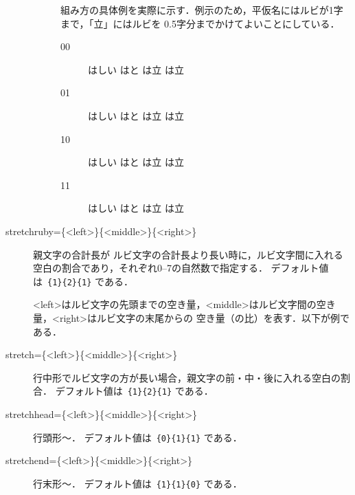 \documentclass[b5paper,10pt]{ltjsarticle}
\begin{document}
\begin{description}
\begin{description}
組み方の具体例を実際に示す．例示のため，平仮名にはルビが1字まで，「立」にはルビを
0.5字分までかけてよいことにしている．
\begin{description}
\item[00]{%
%
はしい
  \quad はと\quad
は立\quad
は立\par}
\item[01]{%
%
はしい
  \quad はと\quad
は立\quad
は立\par}
\item[10]{%
%
はしい
  \quad はと\quad
は立\quad
は立\par}
\item[11]{%
%
はしい\quad
はと\quad
は立\quad
は立\par}
\end{description} 

\end{description}
\item[stretchruby=\{<left>\}\{<middle>\}\{<right>\}] 親文字の合計長が
ルビ文字の合計長より長い時に，ルビ文字間に入れる空白の割合であり，それぞれ0--7の自然数で指定する．
デフォルト値は\ \verb+{1}{2}{1}+ である．

<left>はルビ文字の先頭までの空き量，<middle>はルビ文字間の空き量，<right>はルビ文字の末尾からの
空き量（の比）を表す．以下が例である．
\begin{LTXexample}[width=0.3\textwidth]
\Large
{}
\end{LTXexample}
\item[stretch=\{<left>\}\{<middle>\}\{<right>\}]
行中形でルビ文字の方が長い場合，親文字の前・中・後に入れる空白の割合．
デフォルト値は\ \verb+{1}{2}{1}+ である．
\item[stretchhead=\{<left>\}\{<middle>\}\{<right>\}] 行頭形〜．
デフォルト値は\ \verb+{0}{1}{1}+ である．
\item[stretchend=\{<left>\}\{<middle>\}\{<right>\}] 行末形〜．
デフォルト値は\ \verb+{1}{1}{0}+ である．


\end{description}
\end{document}
